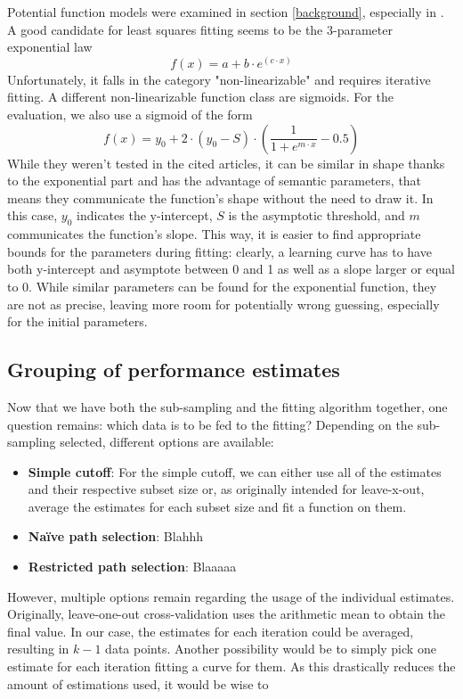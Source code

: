 Potential function models were examined in section \ref{background}, especially in \cite{Singh2005}. A good candidate for least squares fitting seems to be the 3-parameter exponential law
\begin{equation}
f(x) = a + b \cdot e^(c \cdot x)
\end{equation}
Unfortunately, it falls in the category "non-linearizable" and requires iterative fitting. A different non-linearizable function class are sigmoids. For the evaluation, we also use a sigmoid of the form
\begin{equation}
f(x) = y_0 + 2 \cdot (y_0 - S) \cdot \left( \frac{1}{1+e^{m \cdot x}} - 0.5 \right)
\end{equation}
While they weren't tested in the cited articles, it can be similar in shape thanks to the exponential part and has the advantage of semantic parameters, that means they communicate the function's shape without the need to draw it. In this case, $y_0$ indicates the y-intercept, $S$ is the asymptotic threshold, and $m$ communicates the function's slope. This way, it is easier to find appropriate bounds for the parameters during fitting: clearly, a learning curve has to have both y-intercept and asymptote between 0 and 1 as well as a slope larger or equal to 0. While similar parameters can be found for the exponential function, they are not as precise, leaving more room for potentially wrong guessing, especially for the initial parameters.

\subsection{Grouping of performance estimates}
Now that we have both the sub-sampling and the fitting algorithm together, one question remains: which data is to be fed to the fitting? Depending on the sub-sampling selected, different options are available:

\begin{itemize}
	\item \textbf{Simple cutoff}: For the simple cutoff, we can either use all of the estimates and their respective subset size or, as originally intended for leave-x-out, average the estimates for each subset size and fit a function on them. 
	\item \textbf{Na\"{i}ve path selection}: Blahhh
	\item \textbf{Restricted path selection}: Blaaaaa
\end{itemize}

However, multiple options remain regarding the usage of the individual estimates. Originally, leave-one-out cross-validation uses the arithmetic mean to obtain the final value. In our case, the estimates for each iteration could be averaged, resulting in $k-1$ data points. Another possibility would be to simply pick one estimate for each iteration fitting a curve for them. As this drastically reduces the amount of estimations used, it would be wise to 

